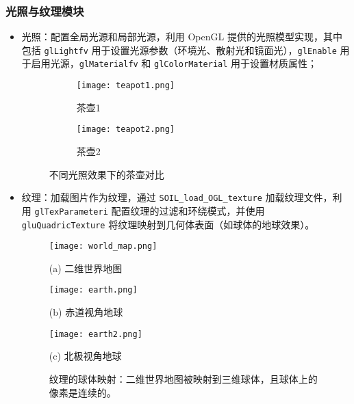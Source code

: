 \documentclass[11pt,a4paper]{article}
\begin{document}
\subsubsection{光照与纹理模块}
\begin{itemize}
    \item 光照：配置全局光源和局部光源，利用 OpenGL 提供的光照模型实现，其中包括 \texttt{glLightfv} 用于设置光源参数（环境光、散射光和镜面光），\texttt{glEnable} 用于启用光源，\texttt{glMaterialfv} 和 \texttt{glColorMaterial} 用于设置材质属性；
    \begin{figure}[h]
        \centering
        \begin{subfigure}[b]{0.45\textwidth}
            \centering
            \texttt{[image: teapot1.png]}
            \caption{茶壶1}
            \label{fig:teapot_no_light}
        \end{subfigure}
        \hfill
        \begin{subfigure}[b]{0.45\textwidth}
            \centering
            \texttt{[image: teapot2.png]}
            \caption{茶壶2}
            \label{fig:teapot_with_light}
        \end{subfigure}
        \caption{不同光照效果下的茶壶对比}
        \label{fig:teapot_light_comparison}
    \end{figure}


    \item 纹理：加载图片作为纹理，通过 \texttt{SOIL\_load\_OGL\_texture} 加载纹理文件，利用 \texttt{glTexParameteri} 配置纹理的过滤和环绕模式，并使用 \texttt{gluQuadricTexture} 将纹理映射到几何体表面（如球体的地球效果）。

    \begin{figure}[H]
        \centering
        \begin{minipage}{0.3\textwidth}
            \centering
            \texttt{[image: world\_map.png]}
            \caption*{(a) 二维世界地图}
        \end{minipage}
        \hfill
        \begin{minipage}{0.3\textwidth}
            \centering
            \texttt{[image: earth.png]}
            \caption*{(b) 赤道视角地球}
        \end{minipage}
        \hfill
        \begin{minipage}{0.3\textwidth}
            \centering
            \texttt{[image: earth2.png]}
            \caption*{(c) 北极视角地球}
        \end{minipage}
        \caption{纹理的球体映射：二维世界地图被映射到三维球体，且球体上的像素是连续的。}
        \label{fig:texture_comparison}
    \end{figure}


\end{itemize}
\end{document}
